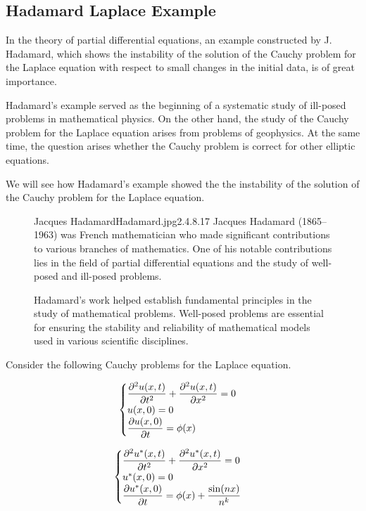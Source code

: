 \subsection{Hadamard Laplace Example}
In the theory of partial differential equations, an example
constructed by J. Hadamard, which shows the instability of
the solution of the Cauchy problem for the Laplace equation
with respect to small changes in the initial data, is of great importance.

Hadamard’s example served as the beginning of a
systematic study of ill-posed problems in mathematical physics.
On the other hand, the study of the Cauchy problem for
the Laplace equation arises from problems of geophysics.
At the same time, the question arises whether the Cauchy problem
is correct for other elliptic equations.

We will see how Hadamard’s example showed the the instability of
the solution of the Cauchy problem for the Laplace equation.

\begin{figure}[b]
    \begin{enrichment}{Jacques Hadamard}{Hadamard.jpg}{2.4}{.8}{.17}
        Jacques Hadamard (1865–1963) was French mathematician who made significant contributions
        to various branches of mathematics. One of his notable contributions lies in the field of
        partial differential equations and the study of well-posed and ill-posed problems.

        Hadamard's work helped establish fundamental principles in the study of mathematical problems.
        Well-posed problems are essential for ensuring the stability and reliability of mathematical models
        used in various scientific disciplines.
    \end{enrichment}
\end{figure}
Consider the following Cauchy problems for the Laplace equation.

\begin{minipage}{.5\textwidth}
    \begin{equation}
        \begin{cases}
            \displaystyle \pdv[2]{u(x,t)}{t} + \pdv[2]{u(x,t)}{x} = 0
            \\
            u(x,0) = 0
            \\
            \displaystyle \pdv{u(x,0)}{t} = \phi(x)
        \end{cases}
    \end{equation}
\end{minipage}
\begin{minipage}{.5\textwidth}
    \begin{equation}
        \begin{cases}
            \displaystyle \pdv[2]{u^{*}(x,t)}{t} + \pdv[2]{u^{*}(x,t)}{x} = 0
            \\
            u^{*}(x,0) = 0
            \\
            \displaystyle \pdv{u^{*}(x,0)}{t} = \phi(x) + \frac{\sin(nx)}{n^{k}}
        \end{cases}
    \end{equation}
\end{minipage}


